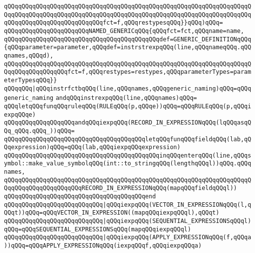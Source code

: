 \verb|qQQqqQQqqQQqqQQqqQQqqQQqqQQqqQQqqQQqqQQqqQQqqQQqqQQqqQQqqQQqqQQqqQQqqQQqqQQqqQQqqQQqqQQqqQQqqQQqqQQqqQQqqQQqqQQqqQQqqQQqqQQqqQQqqQQqqQQqqQQqqQQqqQQqqQQqqQQqqQQqqQQqqQQqfct=f,qQQqrestypesqQQq}}qQQq)qQQq=|\newline
\verb|qQQqqQQqqQQqqQQqqQQqqQQqNAMED_GENERICqQQq{qQQqfct=fct,qQQqname=name,|\newline
\verb|qQQqqQQqqQQqqQQqqQQqqQQqqQQqqQQqqQQqqQQqqQQqdef=GENERIC_DEFINITIONqQQq{qQQqparameter=parameter,qQQqdef=instrstrexpqQQq(line,qQQqnameqQQq.qQQqnames,qQQqd),|\newline
\verb|qQQqqQQqqQQqqQQqqQQqqQQqqQQqqQQqqQQqqQQqqQQqqQQqqQQqqQQqqQQqqQQqqQQqqQQqqQQqqQQqqQQqqQQqfct=f,qQQqrestypes=restypes,qQQqparameterTypes=parameterTypesqQQq}}|\newline
\verb|qQQqqQQq|\verb#|qQQqinstrfctbqQQq(line,qQQqnames,qQQqgeneric_naming)qQQq=qQQqgeneric_naming#\newline
\newline
\verb|andqQQqinstrexpqQQq(line,qQQqnames)qQQq=|\newline
\verb|qQQqletqQQqfunqQQqruleqQQq(RULEqQQq(p,qQQqe))qQQq=qQQqRULEqQQq(p,qQQqiexpqQQqe)|\newline
\verb|qQQqqQQqqQQqqQQqqQQqandqQQqiexpqQQq(RECORD_IN_EXPRESSIONqQQq(lqQQqasqQQq_qQQq.qQQq_))qQQq=|\newline
\verb|qQQqqQQqqQQqqQQqqQQqqQQqqQQqqQQqqQQqqQQqletqQQqfunqQQqfieldqQQq(lab,qQQqexpression)qQQq=qQQq(lab,qQQqiexpqQQqexpression)|\newline
\verb|qQQqqQQqqQQqqQQqqQQqqQQqqQQqqQQqqQQqqQQqqQQqinqQQqenterqQQq(line,qQQqsymbol::make_value_symbolqQQq(int::to_stringqQQq(lengthqQQql))qQQq.qQQqnames,|\newline
\verb|qQQqqQQqqQQqqQQqqQQqqQQqqQQqqQQqqQQqqQQqqQQqqQQqqQQqqQQqqQQqqQQqqQQqqQQqqQQqqQQqqQQqqQQqqQQqRECORD_IN_EXPRESSIONqQQq(mapqQQqfieldqQQql))|\newline
\verb|qQQqqQQqqQQqqQQqqQQqqQQqqQQqqQQqqQQqqQQqend|\newline
\verb|qQQqqQQqqQQqqQQqqQQqqQQqqQQq|\verb#|qQQqiexpqQQq(VECTOR_IN_EXPRESSIONqQQq(l,qQQqt))qQQq=qQQqVECTOR_IN_EXPRESSION((mapqQQqiexpqQQql),qQQqt)#\newline
\verb|qQQqqQQqqQQqqQQqqQQqqQQqqQQq|\verb#|qQQqiexpqQQq(SEQUENTIAL_EXPRESSIONSqQQql)qQQq=qQQqSEQUENTIAL_EXPRESSIONSqQQq(mapqQQqiexpqQQql)#\newline
\verb|qQQqqQQqqQQqqQQqqQQqqQQqqQQq|\verb#|qQQqiexpqQQq(APPLY_EXPRESSIONqQQq(f,qQQqa))qQQq=qQQqAPPLY_EXPRESSIONqQQq(iexpqQQqf,qQQqiexpqQQqa)#\newline
